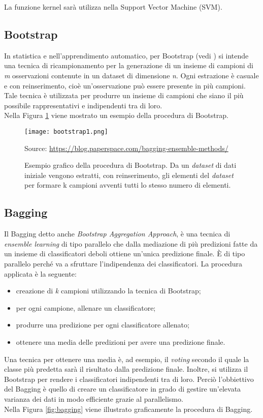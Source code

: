 La funzione kernel sarà utilizza nella Support Vector Machine (SVM).

\subsection{Bootstrap}
In statistica e nell'apprendimento automatico, per Bootstrap (vedi \textit{\cite{bootstrap}}) si intende una tecnica di ricampionamento per la generazione di un insieme di campioni di \emph{m} osservazioni contenute in un dataset di dimensione \emph{n}. Ogni estrazione è casuale e con reinserimento, cioè un’osservazione può essere presente in più campioni. Tale tecnica è utilizzata per produrre un insieme di campioni che siano il più possibile rappresentativi e indipendenti tra di loro.\\
Nella Figura \ref{fig:bootstrap} viene mostrato un esempio della procedura di Bootstrap.

\begin{figure}[h]
	\begin{center}
		\texttt{[image: bootstrap1.png]}
		\caption{Esempio grafico della procedura di Bootstrap. Da un \emph{dataset} di dati iniziale vengono estratti, con reinserimento, gli elementi del \emph{dataset} per formare k campioni avventi tutti lo stesso numero di elementi.
		} 
		Source: \url{https://blog.paperspace.com/bagging-ensemble-methods/}\label{fig:bootstrap}
	\end{center}
\end{figure}

\subsection{Bagging}
Il Bagging \autocite{breiman1996bagging} detto anche \emph{Bootstrap Aggregation Approach}, è una tecnica di \emph{ensemble learning} di tipo parallelo che dalla mediazione di più predizioni fatte da un insieme di classificatori deboli ottiene un'unica predizione finale. È di tipo parallelo perché va a sfruttare l'indipendenza dei classificatori. La procedura applicata è la seguente:
\begin{itemize}
	\item creazione di \emph{k} campioni utilizzando la tecnica di Bootstrap;
	\item per ogni campione, allenare un classificatore;
	\item produrre una predizione per ogni classificatore allenato;
	\item ottenere una media delle predizioni per avere una predizione finale.
\end{itemize} 
Una tecnica per ottenere una media è, ad esempio, il \emph{voting} secondo il quale la classe più predetta sarà il risultato dalla predizione finale. Inoltre, si utilizza il Bootstrap per rendere i classificatori indipendenti tra di loro.
Perciò l'obbiettivo del Bagging è quello di creare un classificatore in grado di gestire un'elevata varianza dei dati in modo efficiente grazie al parallelismo.\\
Nella Figura \ref{fig:bagging} viene illustrato graficamente la procedura di Bagging.


